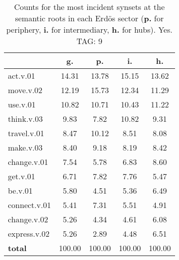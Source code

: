 \begin{table}[h!]
\begin{center}
\begin{tabular}{| l | c | c | c | c |}\hline
 & g. & p. & i. & h. \\\hline
act.v.01 & 14.31  & 13.78  & 15.15  & 13.62 \\\hline
move.v.02 & 12.19  & 15.73  & 12.34  & 11.29 \\\hline
use.v.01 & 10.82  & 10.71  & 10.43  & 11.22 \\\hline
think.v.03 & 9.83  & 7.82  & 10.82  & 9.31 \\\hline
travel.v.01 & 8.47  & 10.12  & 8.51  & 8.08 \\\hline
make.v.03 & 8.40  & 9.18  & 8.19  & 8.42 \\\hline
change.v.01 & 7.54  & 5.78  & 6.83  & 8.60 \\\hline
get.v.01 & 6.71  & 7.82  & 7.76  & 5.47 \\\hline
be.v.01 & 5.80  & 4.51  & 5.36  & 6.49 \\\hline
connect.v.01 & 5.41  & 7.31  & 5.51  & 4.91 \\\hline
change.v.02 & 5.26  & 4.34  & 4.61  & 6.08 \\\hline
express.v.02 & 5.26  & 2.89  & 4.48  & 6.51 \\\hline
{{\bf total}} & 100.00  & 100.00  & 100.00  & 100.00 \\\hline
\end{tabular}
\caption{Counts for the most incident synsets at the semantic roots in each Erd\"os sector ({\bf p.} for periphery, {\bf i.} for intermediary, {\bf h.} for hubs). Yes. TAG: 9}
\end{center}
\end{table}